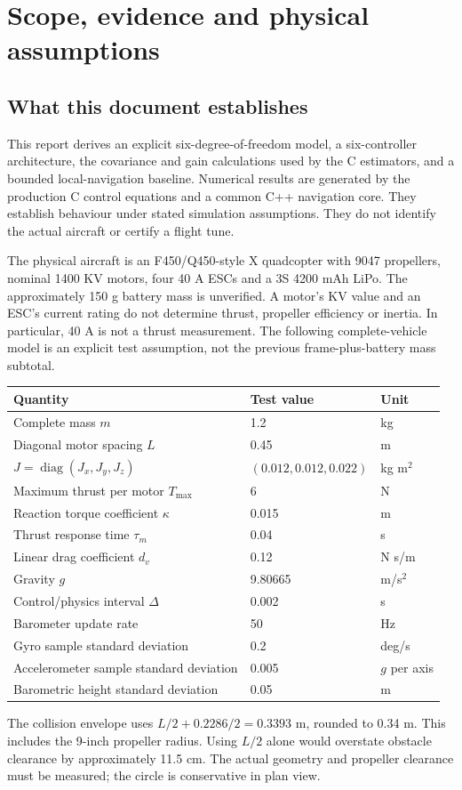 \chapter{Scope, evidence and physical assumptions}
\section{What this document establishes}
This report derives an explicit six-degree-of-freedom model, a six-controller
architecture, the covariance and gain calculations used by the C estimators,
and a bounded local-navigation baseline. Numerical results are generated by the
production C control equations and a common C++ navigation core. They establish
behaviour under stated simulation assumptions. They do not identify the actual
aircraft or certify a flight tune.

The physical aircraft is an F450/Q450-style X quadcopter with 9047 propellers,
nominal 1400 KV motors, four 40 A ESCs and a 3S 4200 mAh LiPo. The approximately
150 g battery mass is unverified. A motor's KV value and an ESC's current rating
do not determine thrust, propeller efficiency or inertia. In particular, 40 A is
not a thrust measurement. The following complete-vehicle model is an explicit
test assumption, not the previous frame-plus-battery mass subtotal.
\begin{center}
\begin{tabular}{lll}\toprule
Quantity & Test value & Unit\\\midrule
Complete mass $m$ & 1.2 & kg\\
Diagonal motor spacing $L$ & 0.45 & m\\
$J=\operatorname{diag}(J_x,J_y,J_z)$ & $(0.012,0.012,0.022)$ & kg m$^2$\\
Maximum thrust per motor $T_{\max}$ & 6 & N\\
Reaction torque coefficient $\kappa$ & 0.015 & m\\
Thrust response time $\tau_m$ & 0.04 & s\\
Linear drag coefficient $d_v$ & 0.12 & N s/m\\
Gravity $g$ & 9.80665 & m/s$^2$\\
Control/physics interval $\Delta$ & 0.002 & s\\
Barometer update rate & 50 & Hz\\
Gyro sample standard deviation & 0.2 & deg/s\\
Accelerometer sample standard deviation & 0.005 & $g$ per axis\\
Barometric height standard deviation & 0.05 & m\\\bottomrule
\end{tabular}
\end{center}
The collision envelope uses $L/2+0.2286/2=0.3393$ m, rounded to
0.34 m. This includes the 9-inch propeller radius. Using $L/2$ alone would
overstate obstacle clearance by approximately 11.5 cm. The actual geometry and
propeller clearance must be measured; the circle is conservative in plan view.

